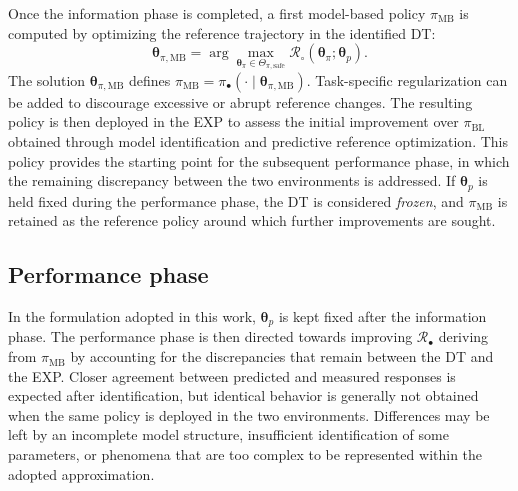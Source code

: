 \documentclass[journal]{IEEEtran}
\begin{document}
Once the information phase is completed, a first model-based policy $\pi_{\mathrm{MB}}$ is computed by optimizing the reference trajectory in the identified DT:
\begin{equation}
 \boldsymbol{\theta}_{\pi,\mathrm{MB}}
 =\arg\max_{\boldsymbol{\theta}_\pi\in\Theta_{\pi,\mathrm{safe}}}
 \mathcal R_\circ(\boldsymbol{\theta}_\pi;\boldsymbol{\theta}_p).
 \label{eq:rt-mb-optimum}
\end{equation}
The solution $\boldsymbol{\theta}_{\pi,\mathrm{MB}}$ defines $\pi_{\mathrm{MB}}=\pi_\bullet(\cdot\mid\boldsymbol{\theta}_{\pi,\mathrm{MB}})$. Task-specific regularization can be added to discourage excessive or abrupt reference changes. The resulting policy is then deployed in the EXP to assess the initial improvement over $\pi_{\mathrm{BL}}$ obtained through model identification and predictive reference optimization. This policy provides the starting point for the subsequent performance phase, in which the remaining discrepancy between the two environments is addressed. If \(\boldsymbol{\theta}_p\) is held fixed during the performance phase, the DT is considered \textit{frozen}, and \(\pi_{\mathrm{MB}}\) is retained as the reference policy around which further improvements are sought.

\subsection{Performance phase}
In the formulation adopted in this work, $\boldsymbol{\theta}_p$ is kept fixed after the information phase. The performance phase is then directed towards improving $\mathcal R_\bullet$ deriving from $\pi_{\mathrm{MB}}$ by accounting for the discrepancies that remain between the DT and the EXP. Closer agreement between predicted and measured responses is expected after identification, but identical behavior is generally not obtained when the same policy is deployed in the two environments. Differences may be left by an incomplete model structure, insufficient identification of some parameters, or phenomena that are too complex to be represented within the adopted approximation.
\end{document}
